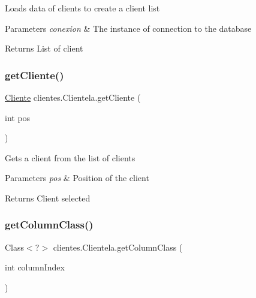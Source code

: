 Loads data of clients to create a client list 
\begin{DoxyParams}{Parameters}
{\em conexion} & The instance of connection to the database \\
\hline
\end{DoxyParams}
\begin{DoxyReturn}{Returns}
List of client 
\end{DoxyReturn}
\mbox{\label{classclientes_1_1_clientela_a1d531f14dc541569b84f1f72c760d376}} 
\subsubsection{\texorpdfstring{get\+Cliente()}{getCliente()}}
{\footnotesize\ttfamily \mbox{\hyperlink{classclientes_1_1_cliente}{Cliente}} clientes.\+Clientela.\+get\+Cliente (\begin{DoxyParamCaption}\item[{int}]{pos }\end{DoxyParamCaption})\hspace{0.3cm}{\ttfamily [inline]}}

Gets a client from the list of clients 
\begin{DoxyParams}{Parameters}
{\em pos} & Position of the client \\
\hline
\end{DoxyParams}
\begin{DoxyReturn}{Returns}
Client selected 
\end{DoxyReturn}
\mbox{\label{classclientes_1_1_clientela_af7d9f77f6b5b1582fcdb4df4b92551fd}} 
\subsubsection{\texorpdfstring{get\+Column\+Class()}{getColumnClass()}}
{\footnotesize\ttfamily Class$<$?$>$ clientes.\+Clientela.\+get\+Column\+Class (\begin{DoxyParamCaption}\item[{int}]{column\+Index }\end{DoxyParamCaption})\hspace{0.3cm}{\ttfamily [inline]}}

